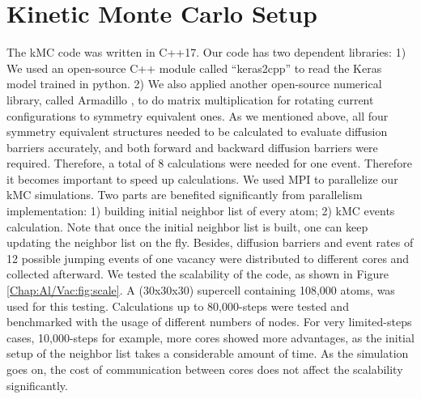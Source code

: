 \section{Kinetic Monte Carlo Setup}
\label{Chap:Al/Vac:section:KMC}


The \ac{kMC} code was written in C++17. \cite{Zhang2020KNN2} Our code has two dependent libraries: 1) We used an open-source C++ module called ``keras2cpp'' to read the Keras model trained in python. \cite{Perevozchikov2019} 2) We also applied another open-source numerical library, called Armadillo \cite{sanderson2016armadillo, sanderson2018user}, to do matrix multiplication for rotating current configurations to symmetry equivalent ones. As we mentioned above, all four symmetry equivalent structures needed to be calculated to evaluate diffusion barriers accurately, and both forward and backward diffusion barriers were required. Therefore, a total of 8 calculations were needed for one event. Therefore it becomes important to speed up calculations. We used \ac{MPI} to parallelize our \ac{kMC} simulations. Two parts are benefited significantly from parallelism implementation: 1) building initial neighbor list of every atom; 2) \ac{kMC} events calculation. Note that once the initial neighbor list is built, one can keep updating the neighbor list on the fly. Besides, diffusion barriers and event rates of 12 possible jumping events of one vacancy were distributed to different cores and collected afterward. We tested the scalability of the code, as shown in Figure \ref{Chap:Al/Vac:fig:scale}. A (30x30x30) supercell containing 108,000 atoms, was used for this testing. Calculations up to 80,000-steps were tested and benchmarked with the usage of different numbers of nodes. For very limited-steps cases, 10,000-steps for example, more cores showed more advantages, as the initial setup of the neighbor list takes a considerable amount of time. As the simulation goes on, the cost of communication between cores does not affect the scalability significantly.


